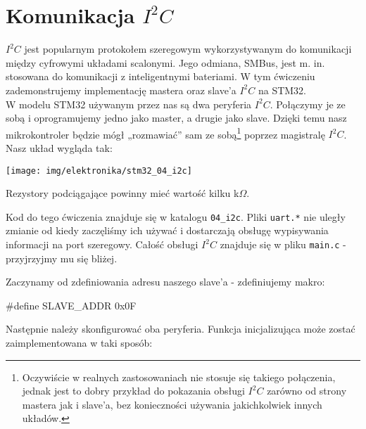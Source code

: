 \documentclass{pdfBooklets}
\begin{document}
\section{Komunikacja $I^2C$}
$I^2C$ jest popularnym protokołem szeregowym wykorzystywanym do komunikacji między cyfrowymi układami scalonymi. Jego odmiana, SMBus, jest m. in.
stosowana do komunikacji z inteligentnymi bateriami. W tym ćwiczeniu zademonstrujemy implementację mastera oraz slave'a $I^2C$ na STM32.\\

W modelu STM32 używanym przez nas są dwa peryferia $I^2C$. Połączymy je ze sobą i oprogramujemy jedno jako master, a drugie jako slave.
Dzięki temu nasz mikrokontroler będzie mógł „rozmawiać” sam ze sobą\footnote{
	Oczywiście w realnych zastosowaniach nie stosuje się takiego połączenia, jednak jest to dobry przykład do pokazania obsługi $I^2C$
	zarówno od strony mastera jak i slave'a, bez konieczności używania jakichkolwiek innych układów.
} poprzez magistralę $I^2C$.
Nasz układ wygląda tak:

\begin{center}\texttt{[image: img/elektronika/stm32\_04\_i2c]}\end{center}

Rezystory podciągające powinny mieć wartość kilku k$\Omega$.

Kod do tego ćwiczenia znajduje się w katalogu \Verb$04_i2c$.
Pliki \Verb$uart.*$ nie uległy zmianie od kiedy zaczęliśmy ich używać i dostarczają obsługę wypisywania informacji na port szeregowy.
Całość obsługi $I^2C$ znajduje się w pliku \Verb$main.c$ - przyjrzyjmy mu się bliżej.

Zaczynamy od zdefiniowania adresu naszego slave'a - zdefiniujemy makro:

\begin{CodeFrame*}[c]{}
#define SLAVE_ADDR 0x0F
\end{CodeFrame*}

Następnie należy skonfigurować oba peryferia. Funkcja inicjalizująca może zostać zaimplementowana w taki sposób:
\end{document}
